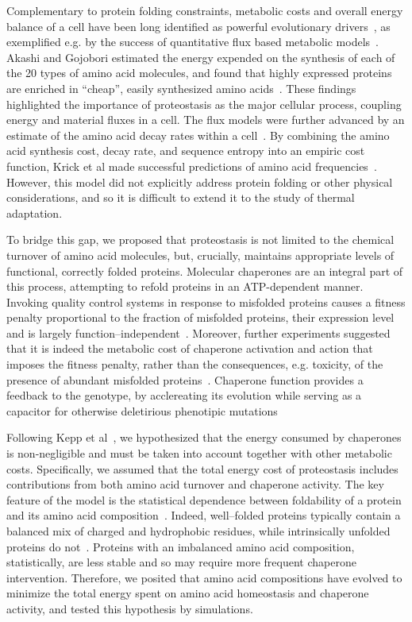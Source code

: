 \documentclass[10pt,letterpaper]{article}
\begin{document}
Complementary to protein folding constraints, metabolic costs and overall energy balance of a cell have been long identified as powerful evolutionary drivers~\cite{Pal2006An}, as exemplified e.g. by the success of quantitative flux based metabolic models~\cite{Varma1994Metabolic,Price2004Genome}. Akashi and Gojobori estimated the energy expended on the synthesis of each of the 20 types of amino acid molecules, and found that highly expressed proteins are enriched in ``cheap'', easily synthesized amino acids~\cite{Akashi2002Metabolic}. These findings highlighted the importance of proteostasis as the major cellular process, coupling energy and material fluxes in a cell. The flux models were further advanced by an estimate of the amino acid decay rates within a cell~\cite{Krick2014Amino}. By combining the amino acid synthesis cost, decay rate, and sequence entropy into an empiric cost function, Krick et al made successful predictions of amino acid frequencies~\cite{Krick2014Amino}. However, this model did not explicitly address protein folding or other physical considerations, and so it is difficult to extend it to the study of thermal adaptation.

To bridge this gap, we proposed that proteostasis is not limited to the chemical turnover of amino acid molecules, but, crucially, maintains appropriate levels of functional, correctly folded proteins. Molecular chaperones are an integral part of this process, attempting to refold proteins in an ATP-dependent manner. Invoking quality control systems in response to misfolded proteins causes a fitness penalty proportional to the fraction of misfolded proteins, their expression level and is largely function--independent~\cite{Samerotte2011Misfolded}. Moreover, further experiments suggested that it is indeed the metabolic cost of chaperone activation and action that imposes the fitness penalty, rather than the consequences, e.g. toxicity, of the presence of abundant misfolded proteins~\cite{Tomala2014Fitness}. Chaperone function provides a feedback to the genotype, by acclereating its evolution while serving as a capacitor for otherwise deletirious phenotipic mutations~\cite{Bogumil2012Cumulative,Cetinbas2013Catalysis}

Following Kepp et al~\cite{Kepp2014Model}, we hypothesized that the energy consumed by chaperones is non-negligible and must be taken into account together with other metabolic costs. Specifically, we assumed that the total energy cost of proteostasis includes contributions from both amino acid turnover and chaperone activity. The key feature of the model is the statistical dependence between foldability of a protein and its amino acid composition~\cite{Dill1985Theory,Berezovsky2007Positive,Venev2015Massively}. Indeed, well--folded proteins typically contain a balanced mix of charged and hydrophobic residues, while intrinsically unfolded proteins do not~\cite{Uversky2000Why}. Proteins with an imbalanced amino acid composition, statistically, are less stable and so may require more frequent chaperone intervention. Therefore, we posited that amino acid compositions have evolved to minimize the total energy spent on amino acid homeostasis and chaperone activity, and tested this hypothesis by simulations.
\end{document}
